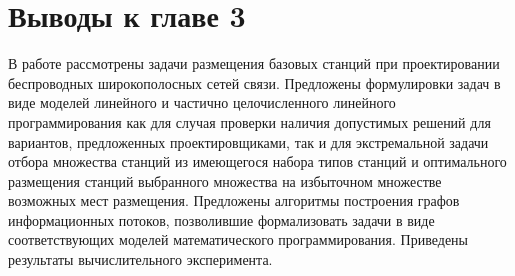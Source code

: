 \section{Выводы к главе 3}
В работе рассмотрены задачи размещения базовых станций при проектировании беспроводных широкополосных сетей связи. Предложены формулировки задач в виде   моделей линейного и частично целочисленного линейного программирования как для случая проверки  наличия допустимых решений для вариантов, предложенных проектировщиками, так и для экстремальной задачи отбора множества станций из имеющегося набора типов станций и оптимального размещения станций выбранного множества на избыточном множестве возможных мест размещения. Предложены алгоритмы построения графов информационных потоков, позволившие формализовать задачи в виде соответствующих моделей математического программирования. Приведены результаты вычислительного эксперимента.

























